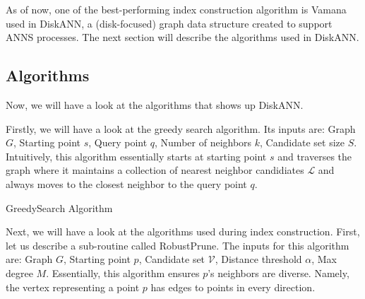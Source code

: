 As of now, one of the best-performing index construction algorithm is Vamana used in DiskANN, a (disk-focused) graph data structure created to support ANNS processes. The next section will describe the algorithms used in DiskANN.

\subsection{Algorithms}

Now, we will have a look at the algorithms that shows up DiskANN.

Firstly, we will have a look at the greedy search algorithm. Its inputs are: Graph \(G\), Starting point \(s\), Query point \(q\), Number of neighbors \(k\), Candidate set size \(S\). Intuitively, this algorithm essentially starts at starting point \(s\) and traverses the graph where it maintains a collection of nearest neighbor candidiates \(\mathcal{L}\) and always moves to the closest neighbor to the query point \(q\).

\begin{algorithm}[H]
\caption{GreedySearch Algorithm}\label{alg:greedy-search}
\begin{algorithmic}[1]
            \EndIf
        \EndWhile
    \EndFunction
\end{algorithmic}
\end{algorithm}

Next, we will have a look at the algorithms used during index construction. First, let us describe a sub-routine called RobustPrune. The inputs for this algorithm are: Graph \(G\), Starting point \(p\), Candidate set \(\mathcal{V}\), Distance threshold \(\alpha\), Max degree \(M\). Essentially, this algorithm ensures \(p\)'s neighbors are diverse. Namely, the vertex representing a point \(p\) has edges to points in every direction.

